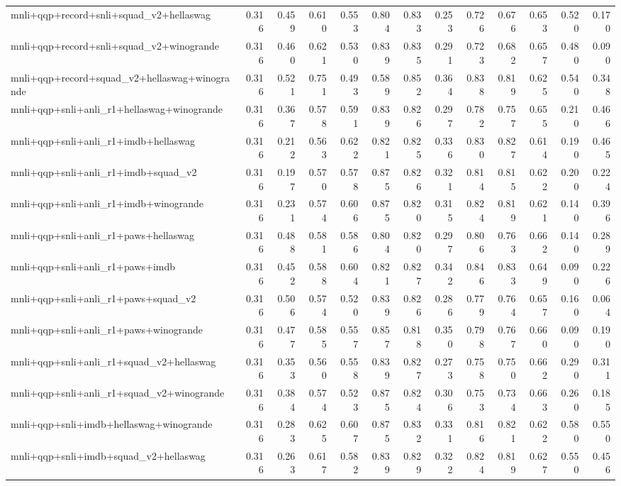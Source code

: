 \begin{table}[t]
\begin{tabular}{lrrrrrrrrrrrr}
    mnli+qqp+record+snli+squad\_v2+hellaswag & 0.316 & 0.459 & 0.610 & 0.553 & 0.804 & 0.833 & 0.253 & 0.726 & 0.676 & 0.653 & 0.520 & 0.170 \\
    mnli+qqp+record+snli+squad\_v2+winogrande & 0.316 & 0.460 & 0.621 & 0.530 & 0.839 & 0.835 & 0.291 & 0.723 & 0.682 & 0.657 & 0.480 & 0.090 \\
    mnli+qqp+record+squad\_v2+hellaswag+winogrande & 0.316 & 0.521 & 0.751 & 0.493 & 0.589 & 0.852 & 0.364 & 0.838 & 0.819 & 0.625 & 0.540 & 0.348 \\
    mnli+qqp+snli+anli\_r1+hellaswag+winogrande & 0.316 & 0.367 & 0.578 & 0.591 & 0.839 & 0.826 & 0.297 & 0.782 & 0.757 & 0.655 & 0.210 & 0.466 \\
    mnli+qqp+snli+anli\_r1+imdb+hellaswag & 0.316 & 0.212 & 0.563 & 0.622 & 0.821 & 0.825 & 0.336 & 0.830 & 0.827 & 0.614 & 0.190 & 0.465 \\
    mnli+qqp+snli+anli\_r1+imdb+squad\_v2 & 0.316 & 0.197 & 0.570 & 0.578 & 0.875 & 0.826 & 0.321 & 0.814 & 0.815 & 0.622 & 0.200 & 0.224 \\
    mnli+qqp+snli+anli\_r1+imdb+winogrande & 0.316 & 0.231 & 0.574 & 0.606 & 0.875 & 0.820 & 0.315 & 0.824 & 0.819 & 0.621 & 0.140 & 0.396 \\
    mnli+qqp+snli+anli\_r1+paws+hellaswag & 0.316 & 0.488 & 0.581 & 0.586 & 0.804 & 0.820 & 0.297 & 0.806 & 0.763 & 0.662 & 0.140 & 0.289 \\
    mnli+qqp+snli+anli\_r1+paws+imdb & 0.316 & 0.452 & 0.588 & 0.604 & 0.821 & 0.827 & 0.342 & 0.846 & 0.833 & 0.649 & 0.090 & 0.226 \\
    mnli+qqp+snli+anli\_r1+paws+squad\_v2 & 0.316 & 0.506 & 0.574 & 0.520 & 0.839 & 0.826 & 0.286 & 0.779 & 0.764 & 0.657 & 0.160 & 0.064 \\
    mnli+qqp+snli+anli\_r1+paws+winogrande & 0.316 & 0.477 & 0.585 & 0.557 & 0.857 & 0.818 & 0.350 & 0.798 & 0.767 & 0.660 & 0.090 & 0.190 \\
    mnli+qqp+snli+anli\_r1+squad\_v2+hellaswag & 0.316 & 0.353 & 0.560 & 0.558 & 0.839 & 0.827 & 0.273 & 0.758 & 0.750 & 0.662 & 0.290 & 0.311 \\
    mnli+qqp+snli+anli\_r1+squad\_v2+winogrande & 0.316 & 0.384 & 0.574 & 0.523 & 0.875 & 0.824 & 0.306 & 0.753 & 0.734 & 0.663 & 0.260 & 0.185 \\
    mnli+qqp+snli+imdb+hellaswag+winogrande & 0.316 & 0.283 & 0.625 & 0.607 & 0.875 & 0.832 & 0.331 & 0.816 & 0.821 & 0.622 & 0.580 & 0.550 \\
    mnli+qqp+snli+imdb+squad\_v2+hellaswag & 0.316 & 0.263 & 0.617 & 0.582 & 0.839 & 0.829 & 0.322 & 0.824 & 0.819 & 0.627 & 0.550 & 0.456 \\

\end{tabular}
\end{table}
